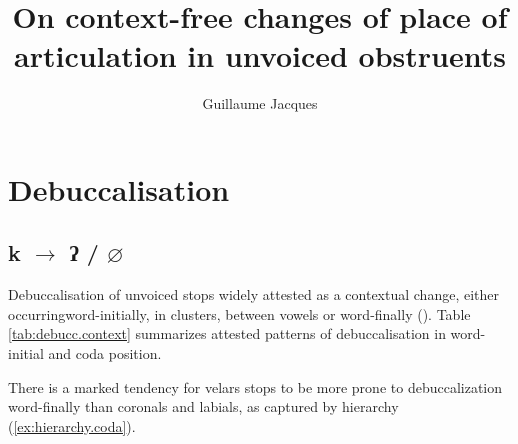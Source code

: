 \documentclass[oldfontcommands,oneside,a4paper,11pt]{article}
\newcommand{\ipa}[1]{{\phon \mbox{#1}}} %
\begin{document}
 

\title{ On context-free changes of place of articulation in unvoiced obstruents }
\author{Guillaume Jacques }
\maketitle

 \section{Debuccalisation}  \label{sec:debucc}
 
 
 \subsection{\ipa{k} $\rightarrow$ \ipa{ʔ} / $\varnothing$} \label{sec:k.glottal}
Debuccalisation of unvoiced stops widely attested     as a contextual change, either occurringword-initially, in clusters, between vowels or word-finally (\citealt[107]{kuemmel07wandel}). Table \ref{tab:debucc.context} summarizes attested patterns of debuccalisation in word-initial and coda position. 


There is a marked tendency for velars stops to be more prone to debuccalization word-finally than coronals and   labials, as captured by hierarchy (\ref{ex:hierarchy.coda}). 
\end{document}
